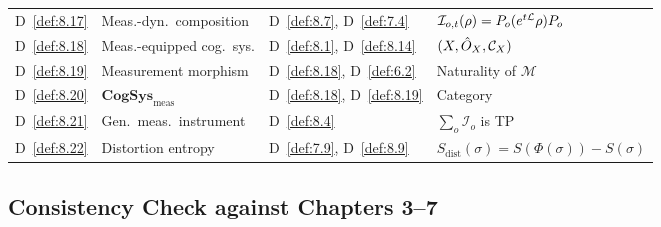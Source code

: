 \begin{center}
\begin{tabular}{llll}
D~\ref{def:8.17} & Meas.-dyn.\ composition &
  D~\ref{def:8.7}, D~\ref{def:7.4} &
  $\mathcal{I}_{o,t}(\rho) = P_o(e^{t\mathcal{L}}\rho)P_o$ \\
D~\ref{def:8.18} & Meas.-equipped cog.\ sys. &
  D~\ref{def:8.1}, D~\ref{def:8.14} &
  $(X, \hat{O}_X, \mathcal{C}_X)$ \\
D~\ref{def:8.19} & Measurement morphism &
  D~\ref{def:8.18}, D~\ref{def:6.2} &
  Naturality of $\mathcal{M}$ \\
D~\ref{def:8.20} & $\mathbf{CogSys}_{\mathrm{meas}}$ &
  D~\ref{def:8.18}, D~\ref{def:8.19} &
  Category \\
D~\ref{def:8.21} & Gen.\ meas.\ instrument &
  D~\ref{def:8.4} &
  $\sum_o \mathcal{I}_o$ is TP \\
D~\ref{def:8.22} & Distortion entropy &
  D~\ref{def:7.9}, D~\ref{def:8.9} &
  $S_{\mathrm{dist}}(\sigma) = S(\Phi(\sigma)) - S(\sigma)$ \\
\hline
\end{tabular}
\end{center}

\subsection{Consistency Check against Chapters 3--7}
\label{sec:ch8:ch37check}

